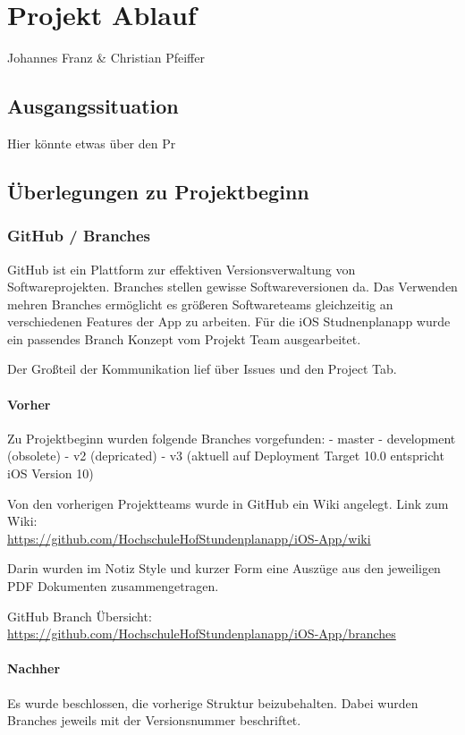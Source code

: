 \chapter{Projekt Ablauf}
Johannes Franz \& Christian Pfeiffer

\section{Ausgangssituation}
Hier könnte etwas über den Pr\\


\newpage
\section{Überlegungen zu Projektbeginn}

\subsection{GitHub / Branches}
GitHub ist ein Plattform zur effektiven Versionsverwaltung von Softwareprojekten. Branches stellen gewisse Softwareversionen da. Das Verwenden mehren Branches ermöglicht es größeren Softwareteams gleichzeitig an verschiedenen Features der App zu arbeiten.
Für die iOS Studnenplanapp wurde ein passendes Branch Konzept vom Projekt Team ausgearbeitet.

Der Großteil der Kommunikation lief über Issues und den Project Tab.

\subsubsection{Vorher}

Zu Projektbeginn wurden folgende Branches vorgefunden:
- master
- development (obsolete)
- v2 (depricated)
- v3 (aktuell auf Deployment Target 10.0 entspricht iOS Version 10)


Von den vorherigen Projektteams wurde in GitHub ein Wiki angelegt.
Link zum Wiki:\\
\url{https://github.com/HochschuleHofStundenplanapp/iOS-App/wiki}

Darin wurden im Notiz Style und kurzer Form eine Auszüge aus den jeweiligen PDF Dokumenten zusammengetragen.




GitHub Branch Übersicht:\\
 \url{https://github.com/HochschuleHofStundenplanapp/iOS-App/branches}

\subsubsection{Nachher}
Es wurde beschlossen, die vorherige Struktur beizubehalten. Dabei wurden Branches jeweils mit der Versionsnummer beschriftet.

